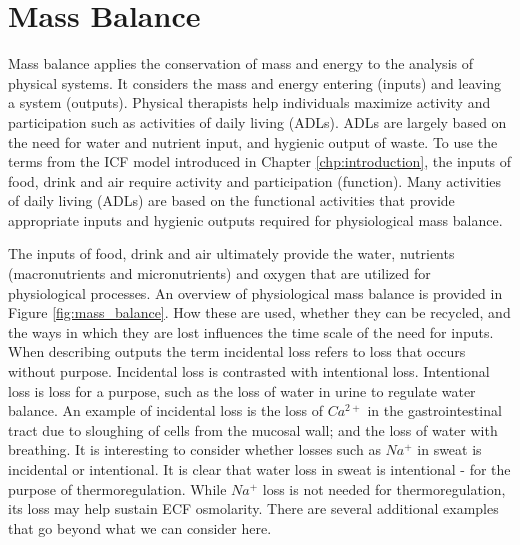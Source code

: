 \section{Mass Balance}

Mass balance applies the conservation of mass and energy to the analysis of physical systems. It considers the mass and energy entering (inputs) and leaving a system (outputs). Physical therapists help individuals maximize activity and participation such as activities of daily living (ADLs). ADLs are largely based on the need for water and nutrient input, and hygienic output of waste. To use the terms from the ICF model introduced in Chapter \ref{chp:introduction}, the inputs of food, drink and air require activity and participation (function). Many activities of daily living (ADLs) are based on the functional activities that provide appropriate inputs and hygienic outputs required for physiological mass balance.

The inputs of food, drink and air ultimately provide the water, nutrients (macronutrients and micronutrients) and oxygen that are utilized for physiological processes. An overview of physiological mass balance is provided in Figure \ref{fig:mass_balance}. How these are used, whether they can be recycled, and the ways in which they are lost influences the time scale of the need for inputs. When describing outputs the term incidental loss refers to loss that occurs without purpose. Incidental loss is contrasted with intentional loss. Intentional loss is loss for a purpose, such as the loss of water in urine to regulate water balance. An example of incidental loss is the loss of $Ca^{2+}$ in the gastrointestinal tract due to sloughing of cells from the mucosal wall; and the loss of water with breathing. It is interesting to consider whether losses such as $Na^+$ in sweat is incidental or intentional. It is clear that water loss in sweat is intentional - for the purpose of thermoregulation. While $Na^+$ loss is not needed for thermoregulation, its loss may help sustain ECF osmolarity. There are several additional examples that go beyond what we can consider here.



